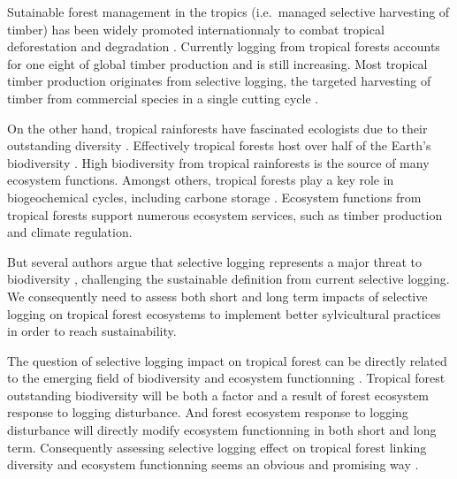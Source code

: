 \documentclass[12pt,]{article}
\theoremstyle{definition}
\theoremstyle{definition}
\theoremstyle{remark}
\begin{document}
Sutainable forest management in the tropics (i.e.~managed selective
harvesting of timber) has been widely promoted internationnaly to combat
tropical deforestation and degradation \citep{Zimmerman2012}. Currently
logging from tropical forests accounts for one eight of global timber
production \citep{Blaser2011} and is still increasing. Most tropical
timber production originates from selective logging, the targeted
harvesting of timber from commercial species in a single cutting cycle
\citep{Martin2015}.

On the other hand, tropical rainforests have fascinated ecologists due
to their outstanding diversity \citep{connell_diversity_1978}.
Effectively tropical forests host over half of the Earth's biodiversity
\citep{Scheffers2012}. High biodiversity from tropical rainforests is
the source of many ecosystem functions. Amongst others, tropical forests
play a key role in biogeochemical cycles, including carbone storage
\citep{Lewis2004}. Ecosystem functions from tropical forests support
numerous ecosystem services, such as timber production and climate
regulation.

But several authors argue that selective logging represents a major
threat to biodiversity
\citep{Carreno-Rocabado2012, DeAvila2015, Gibson2013, Martin2015, Zimmerman2012},
challenging the sustainable definition from current selective logging.
We consequently need to assess both short and long term impacts of
selective logging on tropical forest ecosystems to implement better
sylvicultural practices in order to reach sustainability.

The question of selective logging impact on tropical forest can be
directly related to the emerging field of biodiversity and ecosystem
functionning \citep{Loreau2000}. Tropical forest outstanding
biodiversity will be both a factor and a result of forest ecosystem
response to logging disturbance. And forest ecosystem response to
logging disturbance will directly modify ecosystem functionning in both
short and long term. Consequently assessing selective logging effect on
tropical forest linking diversity and ecosystem functionning seems an
obvious and promising way \citep{Loreau2010}.
\end{document}
